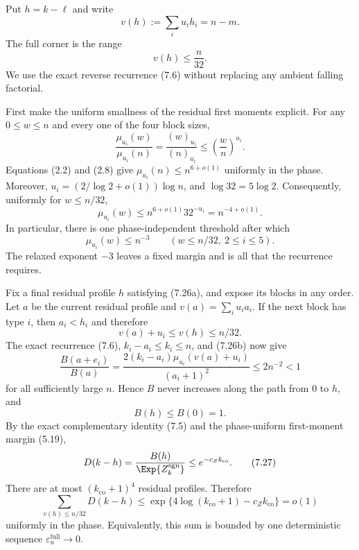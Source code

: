 

Put $h=k-\ell$ and write
\[
  v(h):=\sum_i u_i h_i=n-m.
\]
The full corner is the range
\begin{equation*}
  v(h)\le\frac n{32}.
  \tag{7.26a}
\end{equation*}
We use the exact reverse recurrence (7.6) without replacing any ambient
falling factorial.

First make the uniform smallness of the residual first moments explicit. For
any $0\le w\le n$ and every one of the four block sizes,
\[
  \frac{\mu_{u_i}(w)}{\mu_{u_i}(n)}
  =\frac{(w)_{u_i}}{(n)_{u_i}}
  \le\left(\frac wn\right)^{u_i}.
\]
Equations (2.2) and (2.8) give
$\mu_{u_i}(n)\le n^{6+o(1)}$ uniformly in the phase. Moreover,
$u_i=(2/\log 2+o(1))\log n$, and
$\log 32=5\log 2$. Consequently, uniformly for $w\le n/32$,
\begin{equation*}
  \mu_{u_i}(w)
  \le
  n^{6+o(1)}32^{-u_i}
  =n^{-4+o(1)}.
  \tag{7.26}
\end{equation*}
In particular, there is one phase-independent threshold after which
\begin{equation*}
  \mu_{u_i}(w)\le n^{-3}
  \qquad
  (w\le n/32,\ 2\le i\le5).
  \tag{7.26b}
\end{equation*}
The relaxed exponent $-3$ leaves a fixed margin and is all that the recurrence
requires.

Fix a final residual profile $h$ satisfying (7.26a), and expose its blocks in
any order. Let $a$ be the current residual profile and
$v(a)=\sum_i u_i a_i$. If the next block has type $i$, then
$a_i<h_i$ and therefore
\[
  v(a)+u_i\le v(h)\le n/32.
\]
The exact recurrence (7.6), $k_i-a_i\le k_i\le n$, and (7.26b) now give
\[
  \frac{B(a+e_i)}{B(a)}
  =
  \frac{2(k_i-a_i)\mu_{u_i}(v(a)+u_i)}{(a_i+1)^2}
  \le2n^{-2}<1
\]
for all sufficiently large $n$. Hence $B$ never increases along the path from
$0$ to $h$, and
\begin{equation*}
  B(h)\le B(0)=1.
  \tag{7.27a}
\end{equation*}
By the exact complementary identity (7.5) and the phase-uniform first-moment
margin (5.19),
\begin{equation*}
  D(k-h)
  =\frac{B(h)}{\Exp{Z_k^{\mathrm{sgn}}}}
  \le e^{-c_Zk_{\mathrm{co}}}.
  \tag{7.27}
\end{equation*}
There are at most $(k_{\mathrm{co}}+1)^4$ residual profiles. Therefore
\[
  \sum_{v(h)\le n/32}D(k-h)
  \le
  \exp\{4\log(k_{\mathrm{co}}+1)-c_Zk_{\mathrm{co}}\}
  =o(1)
\]
uniformly in the phase. Equivalently, this sum is bounded by one deterministic
sequence $\varepsilon_n^{\mathrm{full}}\to0$.

